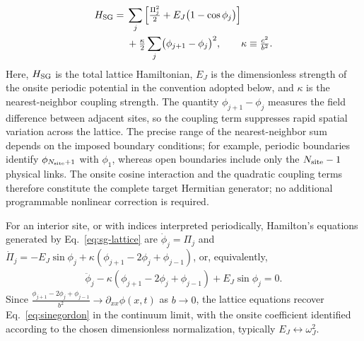 \documentclass[pra,twocolumn,superscriptaddress,nofootinbib,floatfix]{revtex4-2}
\theoremstyle{remark}
\newcommand{\revcolor}{\color{blue}}
\DeclareRobustCommand{\rev}[1]{{\revcolor #1}}
\begin{document}
\begin{align}
H_{\rm SG} ={}&\sum_{j} \left[ \tfrac{\Pi_j^2}{2} + E_J\bigl(1-\cos\phi_j\bigr) \right]\nonumber\\
&+ \tfrac{\kappa}{2}\sum_{j}\bigl(\phi_{j+1}-\phi_j\bigr)^2,\qquad\kappa \equiv \tfrac{c^2}{b^2}.
\label{eq:sg-lattice}
\end{align}
Here, $H_{\rm SG}$ is the total lattice Hamiltonian, $E_J$ is the dimensionless strength of the onsite periodic potential in the convention adopted below, and $\kappa$ is the nearest-neighbor coupling strength. The quantity $\phi_{j+1}-\phi_j$ measures the field difference between adjacent sites, so the coupling term suppresses rapid spatial variation across the lattice. The precise range of the nearest-neighbor sum depends on the imposed boundary conditions; for example, periodic boundaries identify $\phi_{N_{\rm site}+1}$ with $\phi_1$, whereas open boundaries include only the $N_{\rm site}-1$ physical links. The onsite cosine interaction and the quadratic coupling terms therefore constitute the complete target Hermitian generator; no additional programmable nonlinear correction is required.

\rev{For an interior site, or with indices interpreted periodically, Hamilton's equations generated by Eq.~\eqref{eq:sg-lattice} are \(\dot{\phi}_j = \Pi_j\) and \(\dot{\Pi}_j= -E_J\sin\phi_j+ \kappa\left(\phi_{j+1}-2\phi_j+\phi_{j-1}\right)\), or, equivalently,}
\begin{align}
\ddot{\phi}_j- \kappa\left(\phi_{j+1}-2\phi_j+\phi_{j-1}\right)+ E_J\sin\phi_j = 0.
\end{align}
Since $\tfrac{\phi_{j+1}-2\phi_j+\phi_{j-1}}{b^2}\longrightarrow \partial_{xx}\phi(x,t)$ as $b\rightarrow0$, the lattice equations recover Eq.~\eqref{eq:sinegordon} in the continuum limit, with the onsite coefficient identified according to the chosen dimensionless normalization, typically $E_J\leftrightarrow\omega_J^2$.
\end{document}
